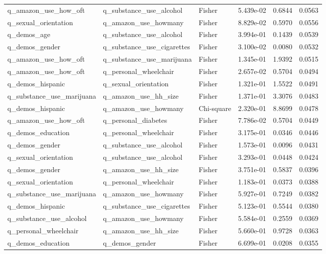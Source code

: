\begin{longtable}[t]{llllrr}
\addlinespace
q\_amazon\_use\_how\_oft & q\_substance\_use\_alcohol & Fisher & 5.439e-02 & 0.6844 & 0.0563\\
q\_sexual\_orientation & q\_amazon\_use\_howmany & Fisher & 8.829e-02 & 0.5970 & 0.0556\\
q\_demos\_age & q\_substance\_use\_alcohol & Fisher & 3.994e-01 & 0.1439 & 0.0539\\
q\_demos\_gender & q\_substance\_use\_cigarettes & Fisher & 3.100e-02 & 0.0080 & 0.0532\\
q\_amazon\_use\_how\_oft & q\_substance\_use\_marijuana & Fisher & 1.345e-01 & 1.9392 & 0.0515\\
\addlinespace
q\_amazon\_use\_how\_oft & q\_personal\_wheelchair & Fisher & 2.657e-02 & 0.5704 & 0.0494\\
q\_demos\_hispanic & q\_sexual\_orientation & Fisher & 1.321e-01 & 1.5522 & 0.0491\\
q\_substance\_use\_marijuana & q\_amazon\_use\_hh\_size & Fisher & 1.371e-01 & 3.3076 & 0.0483\\
q\_demos\_hispanic & q\_amazon\_use\_howmany & Chi-square & 2.320e-01 & 8.8699 & 0.0478\\
q\_amazon\_use\_how\_oft & q\_personal\_diabetes & Fisher & 7.786e-02 & 0.5704 & 0.0449\\
\addlinespace
q\_demos\_education & q\_personal\_wheelchair & Fisher & 3.175e-01 & 0.0346 & 0.0446\\
q\_demos\_gender & q\_substance\_use\_alcohol & Fisher & 1.573e-01 & 0.0096 & 0.0431\\
q\_sexual\_orientation & q\_substance\_use\_alcohol & Fisher & 3.293e-01 & 0.0448 & 0.0424\\
q\_demos\_gender & q\_amazon\_use\_hh\_size & Fisher & 3.751e-01 & 0.5837 & 0.0396\\
q\_sexual\_orientation & q\_personal\_wheelchair & Fisher & 1.183e-01 & 0.0373 & 0.0388\\
\addlinespace
q\_substance\_use\_marijuana & q\_amazon\_use\_howmany & Fisher & 5.927e-01 & 0.7249 & 0.0382\\
q\_demos\_hispanic & q\_substance\_use\_cigarettes & Fisher & 5.123e-01 & 0.5544 & 0.0380\\
q\_substance\_use\_alcohol & q\_amazon\_use\_howmany & Fisher & 5.584e-01 & 0.2559 & 0.0369\\
q\_personal\_wheelchair & q\_amazon\_use\_hh\_size & Fisher & 5.660e-01 & 0.9728 & 0.0363\\
q\_demos\_education & q\_demos\_gender & Fisher & 6.699e-01 & 0.0208 & 0.0355\\

\end{longtable}
